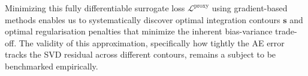 \documentclass[11pt, a4paper]{article}
\begin{document}
Minimizing this fully differentiable surrogate loss $\mathcal{L}^{\mathrm{proxy}}$ using gradient-based methods enables us to systematically discover optimal integration contours $\mathbf{s}$ and optimal regularisation penalties that minimize the inherent bias-variance trade-off. The validity of this approximation, specifically how tightly the AE error tracks the SVD residual across different contours, remains a subject to be benchmarked empirically.
\end{document}
